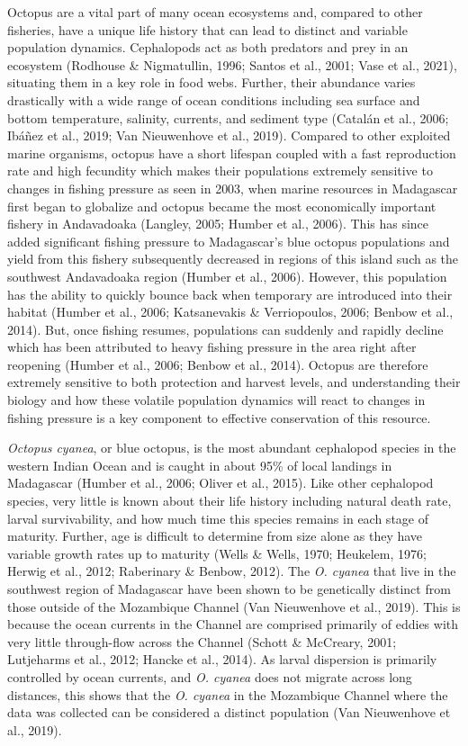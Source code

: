 \documentclass[
]{article}
\begin{document}
Octopus are a vital part of many ocean ecosystems and, compared to other fisheries, have a unique life history that can lead to distinct and variable population dynamics. Cephalopods act as both predators and prey in an ecosystem (Rodhouse \& Nigmatullin, 1996; Santos et al., 2001; Vase et al., 2021), situating them in a key role in food webs. Further, their abundance varies drastically with a wide range of ocean conditions including sea surface and bottom temperature, salinity, currents, and sediment type (Catalán et al., 2006; Ibáñez et al., 2019; Van Nieuwenhove et al., 2019). Compared to other exploited marine organisms, octopus have a short lifespan coupled with a fast reproduction rate and high fecundity which makes their populations extremely sensitive to changes in fishing pressure as seen in 2003, when marine resources in Madagascar first began to globalize and octopus became the most economically important fishery in Andavadoaka (Langley, 2005; Humber et al., 2006). This has since added significant fishing pressure to Madagascar's blue octopus populations and yield from this fishery subsequently decreased in regions of this island such as the southwest Andavadoaka region (Humber et al., 2006). However, this population has the ability to quickly bounce back when temporary are introduced into their habitat (Humber et al., 2006; Katsanevakis \& Verriopoulos, 2006; Benbow et al., 2014). But, once fishing resumes, populations can suddenly and rapidly decline which has been attributed to heavy fishing pressure in the area right after reopening (Humber et al., 2006; Benbow et al., 2014). Octopus are therefore extremely sensitive to both protection and harvest levels, and understanding their biology and how these volatile population dynamics will react to changes in fishing pressure is a key component to effective conservation of this resource.

\emph{Octopus cyanea}, or blue octopus, is the most abundant cephalopod species in the western Indian Ocean and is caught in about 95\% of local landings in Madagascar (Humber et al., 2006; Oliver et al., 2015). Like other cephalopod species, very little is known about their life history including natural death rate, larval survivability, and how much time this species remains in each stage of maturity. Further, age is difficult to determine from size alone as they have variable growth rates up to maturity (Wells \& Wells, 1970; Heukelem, 1976; Herwig et al., 2012; Raberinary \& Benbow, 2012). The \emph{O. cyanea} that live in the southwest region of Madagascar have been shown to be genetically distinct from those outside of the Mozambique Channel (Van Nieuwenhove et al., 2019). This is because the ocean currents in the Channel are comprised primarily of eddies with very little through-flow across the Channel (Schott \& McCreary, 2001; Lutjeharms et al., 2012; Hancke et al., 2014). As larval dispersion is primarily controlled by ocean currents, and \emph{O. cyanea} does not migrate across long distances, this shows that the \emph{O. cyanea} in the Mozambique Channel where the data was collected can be considered a distinct population (Van Nieuwenhove et al., 2019).
\end{document}
